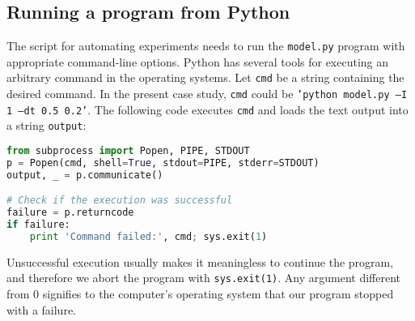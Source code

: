 \documentclass[graybox,sectrefs,envcountresetchap,open=right,final]{svmonodo}
\begin{document}
\subsection{Running a program from Python}

The script for automating experiments needs to run the \texttt{model.py} program
with appropriate command-line options. Python has several tools for
executing an arbitrary command in the operating systems.
Let \texttt{cmd} be a string containing the desired command.
In the present case study, \texttt{cmd} could be \texttt{'python model.py --I 1 --dt 0.5 0.2'}.
The following code
executes \texttt{cmd} and loads the text output into a string \texttt{output}:










\begin{lstlisting}[language=python,style=blue1_bluegreen]
from subprocess import Popen, PIPE, STDOUT
p = Popen(cmd, shell=True, stdout=PIPE, stderr=STDOUT)
output, _ = p.communicate()

# Check if the execution was successful
failure = p.returncode
if failure:
    print 'Command failed:', cmd; sys.exit(1)

\end{lstlisting}

Unsuccessful execution usually makes it meaningless to continue
the program, and therefore we abort the program with \texttt{sys.exit(1)}.
Any argument different from 0 signifies to the computer's operating system
that our program stopped with a failure.
\end{document}
